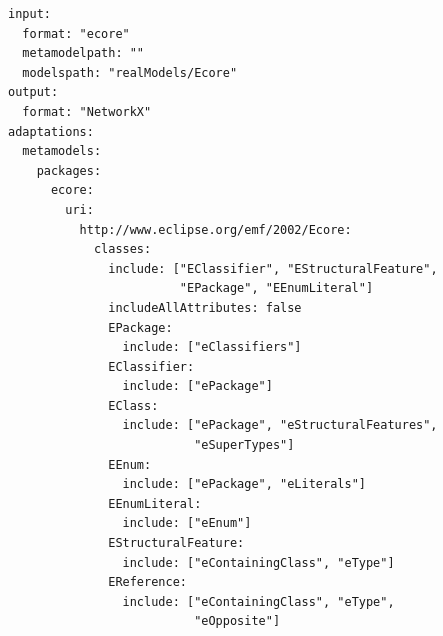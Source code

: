 \documentclass[journal,article,submit,moreauthors,technologies]{Definitions/mdpi}
\newcommand{\rev}[1]{#1}
\begin{document}
\begin{program_}[H]
\footnotesize
\begin{verbatim}
input:
  format: "ecore"
  metamodelpath: ""
  modelspath: "realModels/Ecore"
output:
  format: "NetworkX"
adaptations:
  metamodels:
    packages:
      ecore:
        uri:
          http://www.eclipse.org/emf/2002/Ecore:
            classes:
              include: ["EClassifier", "EStructuralFeature",
                        "EPackage", "EEnumLiteral"]
              includeAllAttributes: false
              EPackage:
                include: ["eClassifiers"]
              EClassifier:
                include: ["ePackage"]
              EClass:
                include: ["ePackage", "eStructuralFeatures",
                          "eSuperTypes"]
              EEnum:
                include: ["ePackage", "eLiterals"]
              EEnumLiteral:
                include: ["eEnum"]
              EStructuralFeature:
                include: ["eContainingClass", "eType"]
              EReference:
                include: ["eContainingClass", "eType",
                          "eOpposite"]
\end{verbatim}
\caption{\rev{The complete MoEGL configuration that replicates the Ecore encoder of Lopez et al.~\cite{lopez2022generating} (29 lines of YAML).}}
\label{code:yamlyakindu}
\end{program_}
\end{document}

